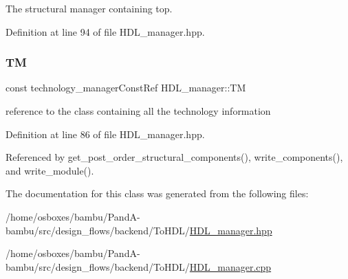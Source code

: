 The structural manager containing top. 



Definition at line 94 of file H\+D\+L\+\_\+manager.\+hpp.

\mbox{\label{classHDL__manager_a36b97521740a378e93cded4e641c4759}} 
\subsubsection{\texorpdfstring{TM}{TM}}
{\footnotesize\ttfamily const technology\+\_\+manager\+Const\+Ref H\+D\+L\+\_\+manager\+::\+TM\hspace{0.3cm}{\ttfamily [private]}}



reference to the class containing all the technology information 



Definition at line 86 of file H\+D\+L\+\_\+manager.\+hpp.



Referenced by get\+\_\+post\+\_\+order\+\_\+structural\+\_\+components(), write\+\_\+components(), and write\+\_\+module().



The documentation for this class was generated from the following files\+:\begin{DoxyCompactItemize}
\item 
/home/osboxes/bambu/\+Pand\+A-\/bambu/src/design\+\_\+flows/backend/\+To\+H\+D\+L/\hyperlink{HDL__manager_8hpp}{H\+D\+L\+\_\+manager.\+hpp}\item 
/home/osboxes/bambu/\+Pand\+A-\/bambu/src/design\+\_\+flows/backend/\+To\+H\+D\+L/\hyperlink{HDL__manager_8cpp}{H\+D\+L\+\_\+manager.\+cpp}\end{DoxyCompactItemize}
